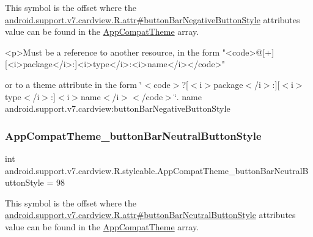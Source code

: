 This symbol is the offset where the \hyperlink{classandroid_1_1support_1_1v7_1_1cardview_1_1R_1_1attr_a53796ccf1b5a88dc298dfaf30cf3e8db}{android.\+support.\+v7.\+cardview.\+R.\+attr\#button\+Bar\+Negative\+Button\+Style} attribute\textquotesingle{}s value can be found in the \hyperlink{classandroid_1_1support_1_1v7_1_1cardview_1_1R_1_1styleable_a52e6f69f954ecc2622d72c0b4d298938}{App\+Compat\+Theme} array.

\begin{DoxyVerb}      <p>Must be a reference to another resource, in the form "<code>@[+][<i>package</i>:]<i>type</i>:<i>name</i></code>"
\end{DoxyVerb}
 or to a theme attribute in the form \char`\"{}$<$code$>$?\mbox{[}$<$i$>$package$<$/i$>$\+:\mbox{]}\mbox{[}$<$i$>$type$<$/i$>$\+:\mbox{]}$<$i$>$name$<$/i$>$$<$/code$>$\char`\"{}.  name android.\+support.\+v7.\+cardview\+:button\+Bar\+Negative\+Button\+Style \mbox{\label{classandroid_1_1support_1_1v7_1_1cardview_1_1R_1_1styleable_afc6ef0b8097f2e788fe27aed74360c29}} 
\subsubsection{\texorpdfstring{App\+Compat\+Theme\+\_\+button\+Bar\+Neutral\+Button\+Style}{AppCompatTheme\_buttonBarNeutralButtonStyle}}
{\footnotesize\ttfamily int android.\+support.\+v7.\+cardview.\+R.\+styleable.\+App\+Compat\+Theme\+\_\+button\+Bar\+Neutral\+Button\+Style = 98\hspace{0.3cm}{\ttfamily [static]}}

This symbol is the offset where the \hyperlink{classandroid_1_1support_1_1v7_1_1cardview_1_1R_1_1attr_ae12477d15a1f3158bd485a520e4096aa}{android.\+support.\+v7.\+cardview.\+R.\+attr\#button\+Bar\+Neutral\+Button\+Style} attribute\textquotesingle{}s value can be found in the \hyperlink{classandroid_1_1support_1_1v7_1_1cardview_1_1R_1_1styleable_a52e6f69f954ecc2622d72c0b4d298938}{App\+Compat\+Theme} array.


